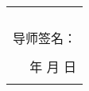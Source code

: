 \begin{table}[H]
\begin{tabular}{|rrrrrr|}
		\multicolumn{6}{|r|}{} \\
		\multicolumn{6}{|r|}{} \\
		\multicolumn{6}{|r|}{} \\
		\multicolumn{6}{|r|}{} \\
		\multicolumn{6}{|p{35.88em}|}{                                                                             \hfill 导师签名：\qquad\qquad\qquad\qquad\qquad\qquad\qquad\qquad } \\
		\multicolumn{6}{|r|}{} \\
		\multicolumn{6}{|p{35.88em}|}{\hfill 年 \qquad\quad 月 \qquad\quad 日 \qquad\qquad\qquad} \\
		\multicolumn{6}{|r|}{} \\
		\hline
	\end{tabular}
\end{table}

\renewcommand\arraystretch{1}
\restoregeometry

